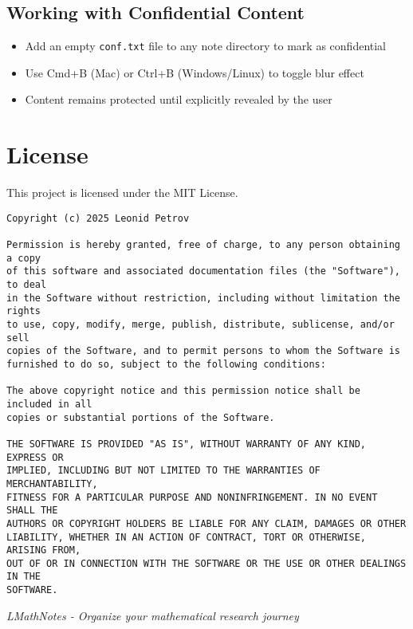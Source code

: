 \documentclass{article}
\begin{document}
\subsection{Working with Confidential Content}
\begin{itemize}
  \item Add an empty \texttt{conf.txt} file to any note directory to mark as confidential
  \item Use Cmd+B (Mac) or Ctrl+B (Windows/Linux) to toggle blur effect
  \item Content remains protected until explicitly revealed by the user
\end{itemize}

\section{License}

This project is licensed under the MIT License.

\begin{verbatim}
Copyright (c) 2025 Leonid Petrov

Permission is hereby granted, free of charge, to any person obtaining a copy
of this software and associated documentation files (the "Software"), to deal
in the Software without restriction, including without limitation the rights
to use, copy, modify, merge, publish, distribute, sublicense, and/or sell
copies of the Software, and to permit persons to whom the Software is
furnished to do so, subject to the following conditions:

The above copyright notice and this permission notice shall be included in all
copies or substantial portions of the Software.

THE SOFTWARE IS PROVIDED "AS IS", WITHOUT WARRANTY OF ANY KIND, EXPRESS OR
IMPLIED, INCLUDING BUT NOT LIMITED TO THE WARRANTIES OF MERCHANTABILITY,
FITNESS FOR A PARTICULAR PURPOSE AND NONINFRINGEMENT. IN NO EVENT SHALL THE
AUTHORS OR COPYRIGHT HOLDERS BE LIABLE FOR ANY CLAIM, DAMAGES OR OTHER
LIABILITY, WHETHER IN AN ACTION OF CONTRACT, TORT OR OTHERWISE, ARISING FROM,
OUT OF OR IN CONNECTION WITH THE SOFTWARE OR THE USE OR OTHER DEALINGS IN THE
SOFTWARE.
\end{verbatim}

\vspace{1cm}
\hrulefill

\begin{center}
\textit{LMathNotes - Organize your mathematical research journey}
\end{center}
\end{document}

